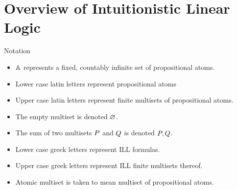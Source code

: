 \documentclass{beamer}
\begin{document}
\section{Overview of Intuitionistic Linear Logic}
\begin{frame}{Notation}
	\begin{itemize}[label={-}]
		\item $\mathbb{A}$ represents a fixed, countably infinite set of propositional atoms. 
		\item Lower case latin letters represent propositional atoms 
		\item Upper case latin letters represent finite multisets of propositional atoms. 
		\item The empty multiset is denoted $\varnothing$. 
		\item The sum of two multisets ${P}$ and ${Q}$ is denoted ${P},{Q}$. 
		\item Lower case greek letters represent ILL formulas.
		\item Upper case greek letters represent ILL finite multisets thereof. 
		\item Atomic multiset is taken to mean multiset of propositional atoms.
	\end{itemize}
\end{frame}
\end{document}

